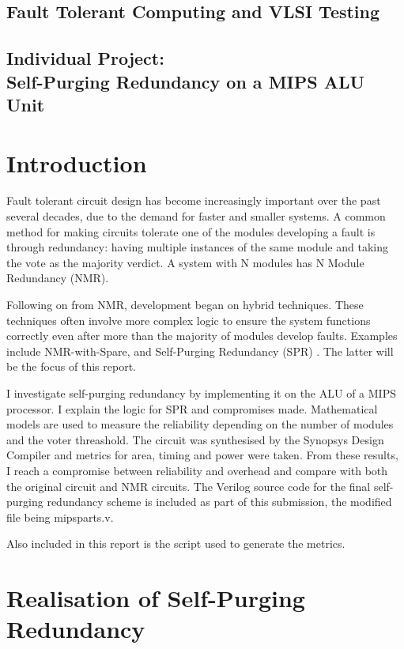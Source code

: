 \documentclass[a4paper,12pt]{article}
\begin{document}
    \begin{center}
        \section*{Fault Tolerant Computing and VLSI Testing}
        \subsection*{Individual Project:\\Self-Purging Redundancy on a MIPS ALU Unit}
    \end{center}

    \section{Introduction}

    Fault tolerant circuit design has become increasingly important over the past several decades, due to the demand for faster and smaller systems. A common method for making circuits tolerate one of the modules developing a fault is through redundancy: having multiple instances of the same module and taking the vote as the majority verdict. A system with N modules has N Module Redundancy (NMR).

    Following on from NMR, development began on hybrid techniques. These techniques often involve more complex logic to ensure the system functions correctly even after more than the majority of modules develop faults. Examples include NMR-with-Spare, and Self-Purging Redundancy (SPR) \cite{1674656}. The latter will be the focus of this report.

    I investigate self-purging redundancy by implementing it on the ALU of a MIPS processor. I explain the logic for SPR and compromises made. Mathematical models are used to measure the reliability depending on the number of modules and the voter threashold. The circuit was synthesised by the Synopsys Design Compiler and metrics for area, timing and power were taken. From these results, I reach a compromise between reliability and overhead and compare with both the original circuit and NMR circuits. The Verilog source code for the final self-purging redundancy scheme is included as part of this submission, the modified file being mipsparts.v.

    Also included in this report is the script used to generate the metrics.

    \section{Realisation of Self-Purging Redundancy}
    \label{sec:realisation}
\end{document}
